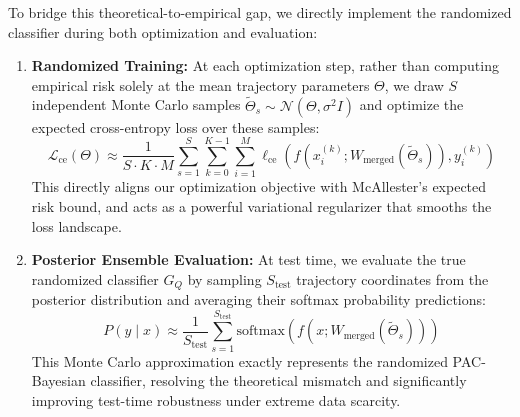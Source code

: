 To bridge this theoretical-to-empirical gap, we directly implement the randomized classifier during both optimization and evaluation:
\begin{enumerate}
    \item \textbf{Randomized Training:} At each optimization step, rather than computing empirical risk solely at the mean trajectory parameters $\Theta$, we draw $S$ independent Monte Carlo samples $\tilde{\Theta}_s \sim \mathcal{N}(\Theta, \sigma^2 I)$ and optimize the expected cross-entropy loss over these samples:
    \begin{equation}
    \mathcal{L}_{\text{ce}}(\Theta) \approx \frac{1}{S \cdot K \cdot M} \sum_{s=1}^S \sum_{k=0}^{K-1} \sum_{i=1}^{M} \ell_{\text{ce}}\left(f\left(x_i^{(k)}; W_{\text{merged}}(\tilde{\Theta}_s)\right), y_i^{(k)}\right)
    \end{equation}
    This directly aligns our optimization objective with McAllester's expected risk bound, and acts as a powerful variational regularizer that smooths the loss landscape.
    \item \textbf{Posterior Ensemble Evaluation:} At test time, we evaluate the true randomized classifier $G_Q$ by sampling $S_{\text{test}}$ trajectory coordinates from the posterior distribution and averaging their softmax probability predictions:
    \begin{equation}
    P(y \mid x) \approx \frac{1}{S_{\text{test}}} \sum_{s=1}^{S_{\text{test}}} \mathrm{softmax}\left( f\left(x; W_{\text{merged}}(\tilde{\Theta}_s)\right) \right)
    \end{equation}
    This Monte Carlo approximation exactly represents the randomized PAC-Bayesian classifier, resolving the theoretical mismatch and significantly improving test-time robustness under extreme data scarcity.
\end{enumerate}
